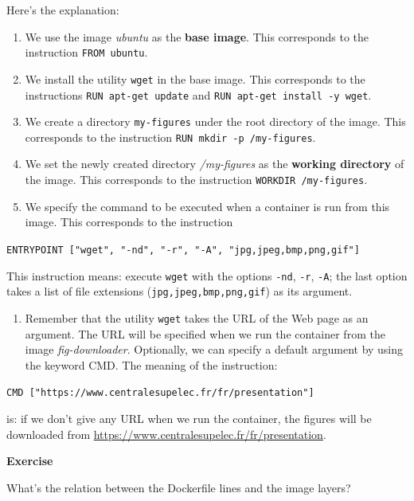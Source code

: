\documentclass[
]{article}
\providecommand{\tightlist}{%
  \setlength{\itemsep}{0pt}\setlength{\parskip}{0pt}}
\newenvironment{infobox}[1]
  {
  \begin{itemize}
  \renewcommand{\labelitemi}{
    \raisebox{-.7\height}[0pt][0pt]{
      
    }
  }
  \setlength{\fboxsep}{1em}
  \begin{whitebox}
  \item
  }
  {
  \end{whitebox}
  \end{itemize}
  }
\theoremstyle{definition}
\theoremstyle{definition}
\theoremstyle{definition}
\theoremstyle{remark}
\let\BeginKnitrBlock\begin \let\EndKnitrBlock\end
\begin{document}
Here's the explanation:

\begin{enumerate}
\def\labelenumi{\arabic{enumi}.}
\item
  We use the image \emph{ubuntu} as the \textbf{base image}.
  This corresponds to the instruction \texttt{FROM\ ubuntu}.
\item
  We install the utility \texttt{wget} in the base image.
  This corresponds to the
  instructions \texttt{RUN\ apt-get\ update} and \texttt{RUN\ apt-get\ install\ -y\ wget}.
\item
  We create a directory \texttt{my-figures} under the root directory of the image.
  This corresponds to the instruction \texttt{RUN\ mkdir\ -p\ /my-figures}.
\item
  We set the newly created directory \emph{/my-figures} as the
  \textbf{working directory} of the image. This corresponds to the
  instruction \texttt{WORKDIR\ /my-figures}.
\item
  We specify the command to be executed when a container is run from this image.
  This corresponds to the instruction
\end{enumerate}

\texttt{ENTRYPOINT\ {[}"wget",\ "-nd",\ "-r",\ "-A",\ "jpg,jpeg,bmp,png,gif"{]}}

This instruction means: execute \texttt{wget} with the options
\texttt{-nd}, \texttt{-r}, \texttt{-A};
the last option takes a list of file
extensions (\texttt{jpg,jpeg,bmp,png,gif}) as its argument.

\begin{enumerate}
\def\labelenumi{\arabic{enumi}.}
\setcounter{enumi}{5}
\tightlist
\item
  Remember that the utility \texttt{wget} takes the URL of the Web page as
  an argument. The URL will be specified when we run the container from
  the image \emph{fig-downloader}.
  Optionally, we can specify a default argument by using the
  keyword CMD. The meaning of the instruction:
\end{enumerate}

\texttt{CMD\ {[}"https://www.centralesupelec.fr/fr/presentation"{]}}

is: if we don't give any URL when we run the container, the figures will
be downloaded from
\url{https://www.centralesupelec.fr/fr/presentation}.

\begin{infobox}{exercisebox}

\textbf{Exercise}

\BeginKnitrBlock{exercise}
\label{exr:unnamed-chunk-15}{\label{exr:unnamed-chunk-15} }What's the relation between the Dockerfile lines and the image layers?
\EndKnitrBlock{exercise}

\end{infobox}
\end{document}
